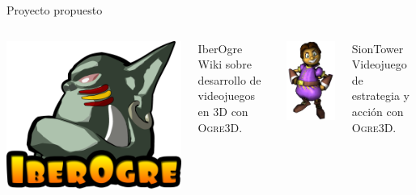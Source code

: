 \documentclass[green]{beamer}
\begin{document}
\begin{frame}{Proyecto propuesto}
    \begin{columns}[t]
    
    \column{150px}
	\begin{center}
	    \includegraphics[scale=0.1]{img/iberogre.png}
	\end{center}
	\begin{block}{IberOgre}
	    Wiki sobre desarrollo de videojuegos en 3D
	    con \textsc{Ogre3D}.
	\end{block}
	
    \column{150px}
	\begin{center}
	    \includegraphics[scale=0.18]{img/personaje.png}
	\end{center}
	\begin{block}{SionTower}
	    Videojuego de estrategia y acción con \textsc{Ogre3D}.
	\end{block}
    
    \end{columns}
\end{frame}
\end{document}
